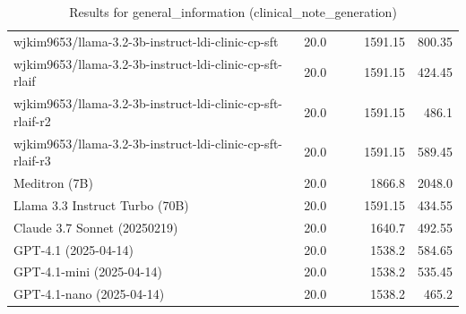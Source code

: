 \begin{table}[htp]
{\begin{tabular}{lrrrrr}
wjkim9653/llama-3.2-3b-instruct-ldi-clinic-cp-sft & 20.0 &  &  & 1591.15 & 800.35 \\
wjkim9653/llama-3.2-3b-instruct-ldi-clinic-cp-sft-rlaif & 20.0 &  &  & 1591.15 & 424.45 \\
wjkim9653/llama-3.2-3b-instruct-ldi-clinic-cp-sft-rlaif-r2 & 20.0 &  &  & 1591.15 & 486.1 \\
wjkim9653/llama-3.2-3b-instruct-ldi-clinic-cp-sft-rlaif-r3 & 20.0 &  &  & 1591.15 & 589.45 \\
Meditron (7B) & 20.0 &  &  & 1866.8 & 2048.0 \\
Llama 3.3 Instruct Turbo (70B) & 20.0 &  &  & 1591.15 & 434.55 \\
Claude 3.7 Sonnet (20250219) & 20.0 &  &  & 1640.7 & 492.55 \\
GPT-4.1 (2025-04-14) & 20.0 &  &  & 1538.2 & 584.65 \\
GPT-4.1-mini (2025-04-14) & 20.0 &  &  & 1538.2 & 535.45 \\
GPT-4.1-nano (2025-04-14) & 20.0 &  &  & 1538.2 & 465.2 \\
\bottomrule
\end{tabular}}
\caption{Results for general_information (clinical_note_generation)}
\label{fig:general_information (clinical_note_generation)}
\end{table}
